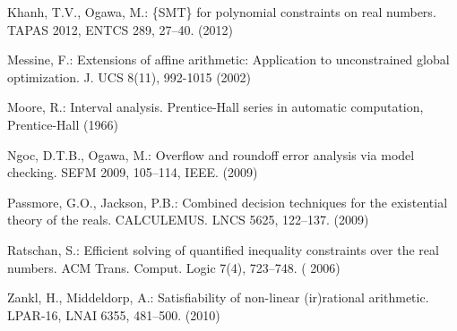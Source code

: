 \documentclass[runningheads,a4paper,oribibl]{llncs}
\begin{document}
\begin{thebibliography}{10}
Khanh, T.V., Ogawa, M.: \{SMT\} for polynomial constraints on real numbers.
TAPAS 2012, ENTCS 289, 27--40. (2012)

Messine, F.: Extensions of affine arithmetic: Application to unconstrained
  global optimization.  J. UCS 8(11), 992-1015 (2002)

Moore, R.: Interval analysis. Prentice-Hall series in automatic computation,
  Prentice-Hall (1966)

Ngoc, D.T.B., Ogawa, M.: Overflow and roundoff error analysis via model
  checking. 
  SEFM 2009, 105--114, IEEE. (2009)

Passmore, G.O., Jackson, P.B.: Combined decision techniques for the existential
  theory of the reals. CALCULEMUS. LNCS 5625, 122--137. (2009)

Ratschan, S.: Efficient solving of quantified inequality constraints over the
  real numbers. ACM Trans. Comput. Logic  7(4),  723--748. ( 2006)

Zankl, H., Middeldorp, A.: Satisfiability of non-linear (ir)rational
arithmetic. LPAR-16, LNAI 6355, 481--500. (2010)
\end{thebibliography}
\end{document}
